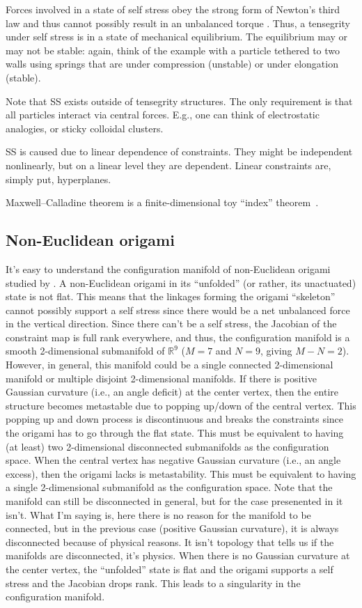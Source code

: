 Forces involved in a state of self stress obey the strong form of Newton's third law and thus cannot possibly result in an unbalanced torque \cite[\S 1.2]{goldstein2002}.
Thus, a tensegrity under self stress is in a state of mechanical equilibrium.
The equilibrium may or may not be stable: again, think of the example with a particle tethered to two walls using springs that are under compression (unstable) or under elongation (stable).

Note that SS exists outside of tensegrity structures.
The only requirement is that all particles interact via central forces.
E.g., one can think of electrostatic analogies, or sticky colloidal clusters.

SS is caused due to linear dependence of constraints.
They might be independent nonlinearly, but on a linear level they are dependent.
Linear constraints are, simply put, hyperplanes.

Maxwell--Calladine theorem is a finite-dimensional toy ``index'' theorem~\cite[\S 2.2]{nakahara2003}.

\subsection{Non-Euclidean origami}

It's easy to understand the configuration manifold of non-Euclidean origami studied by \cite{berry2020}.
A non-Euclidean origami in its ``unfolded'' (or rather, its unactuated) state is not flat.
This means that the linkages forming the origami ``skeleton'' cannot possibly support a self stress since there would be a net unbalanced force in the vertical direction.
Since there can't be a self stress, the Jacobian of the constraint map is full rank everywhere, and thus, the configuration manifold is a smooth 2-dimensional submanifold of $\mathbb{R}^9$ ($M = 7$ and $N = 9$, giving $M - N = 2$).
However, in general, this manifold could be a single connected 2-dimensional manifold or multiple disjoint 2-dimensional manifolds.
If there is positive Gaussian curvature (i.e., an angle deficit) at the center vertex, then the entire structure becomes metastable due to popping up/down of the central vertex.
This popping up and down process is discontinuous and breaks the constraints since the origami has to go through the flat state.
This must be equivalent to having (at least) two 2-dimensional disconnected submanifolds as the configuration space.
When the central vertex has negative Gaussian curvature (i.e., an angle excess), then the origami lacks is metastability.
This must be equivalent to having a single 2-dimensional submanifold as the configuration space.
Note that the manifold can still be disconnected in general, but for the case presenented in \cite{berry2020} it isn't.
What I'm saying is, here there is no reason for the manifold to be connected, but in the previous case (positive Gaussian curvature), it is always disconnected because of physical reasons.
It isn't topology that tells us if the manifolds are disconnected, it's physics.
When there is no Gaussian curvature at the center vertex, the ``unfolded'' state is flat and the origami supports a self stress and the Jacobian drops rank.
This leads to a singularity in the configuration manifold.

